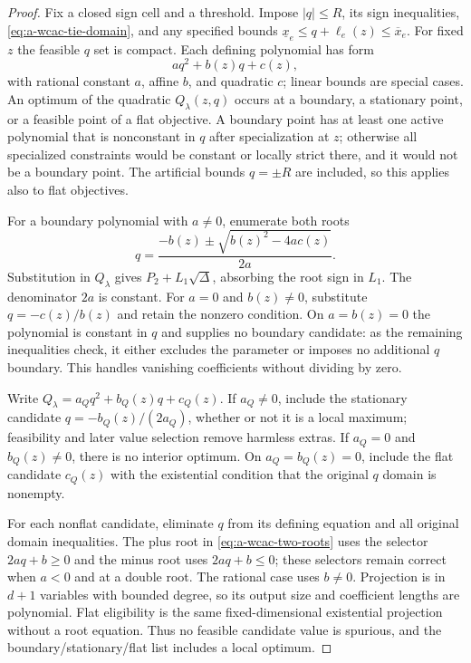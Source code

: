 \begin{proof}
Fix a closed sign cell and a threshold. Impose $|q|\le R$, its sign
inequalities, \eqref{eq:a-wcac-tie-domain}, and any specified bounds
$\underline x_e\le q+\ell_e(z)\le\overline x_e$. For fixed $z$ the feasible
$q$ set is compact. Each defining polynomial has form
\[
 a q^2+b(z)q+c(z),
\]
with rational constant $a$, affine $b$, and quadratic $c$; linear bounds
are special cases. An optimum of the quadratic $Q_\lambda(z,q)$ occurs
at a boundary, a stationary point, or a feasible point of a flat objective.
A boundary point has at least one active polynomial that is nonconstant
in $q$ after specialization at $z$; otherwise all specialized constraints
would be constant or locally strict there, and it would not be a boundary
point. The artificial bounds $q=\pm R$ are included, so this applies also
to flat objectives.

For a boundary polynomial with $a\ne0$, enumerate both roots
\begin{equation}
 q=\frac{-b(z)\pm\sqrt{b(z)^2-4ac(z)}}{2a}.
 \label{eq:a-wcac-two-roots}
\end{equation}
Substitution in $Q_\lambda$ gives $P_2+L_1\sqrt\Delta$, absorbing the
root sign in $L_1$. The denominator $2a$ is constant. For $a=0$ and
$b(z)\ne0$, substitute $q=-c(z)/b(z)$ and retain the nonzero condition.
On $a=b(z)=0$ the polynomial is constant in $q$ and supplies no boundary
candidate: as the remaining inequalities check, it either excludes the
parameter or imposes no additional $q$ boundary. This handles vanishing
coefficients without dividing by zero.

Write $Q_\lambda=a_Qq^2+b_Q(z)q+c_Q(z)$. If $a_Q\ne0$, include the
stationary candidate $q=-b_Q(z)/(2a_Q)$, whether or not it is a local
maximum; feasibility and later value selection remove harmless extras.
If $a_Q=0$ and $b_Q(z)\ne0$, there is no interior optimum. On
$a_Q=b_Q(z)=0$, include the flat candidate $c_Q(z)$ with the existential
condition that the original $q$ domain is nonempty.

For each nonflat candidate, eliminate $q$ from its defining equation and
all original domain inequalities. The plus root in
\eqref{eq:a-wcac-two-roots} uses the selector $2aq+b\ge0$ and the minus
root uses $2aq+b\le0$; these selectors remain correct when $a<0$ and at
a double root. The rational case uses $b\ne0$. Projection is in $d+1$
variables with bounded degree, so its output size and coefficient lengths
are polynomial. Flat eligibility is the same fixed-dimensional existential
projection without a root equation. Thus no feasible candidate value is
spurious, and the boundary/stationary/flat list includes a local optimum.
\end{proof}

